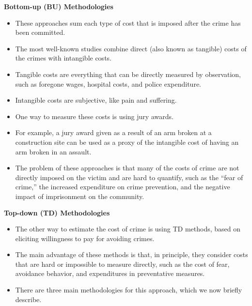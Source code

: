 \documentclass[static]{JJH-Beamer}
\begin{document}
\begin{frame}

\begin{center}
\textbf{Bottom-up (BU) Methodologies}
\end{center}
\begin{itemize}
\item These approaches sum each type of cost that is imposed after the crime has been committed.
\item The most well-known studies combine direct (also known as tangible) costs of the crimes with intangible costs.
\item Tangible costs are everything that can be directly measured by observation, such as foregone wages, hospital costs, and police expenditure.
\item Intangible costs are subjective, like pain and suffering.
\item One way to measure these costs is using jury awards.
\item For example, a jury award given as a result of an arm broken at a construction site can be used as a proxy of the intangible cost of having an arm broken in an assault.
\item The problem of these approaches is that many of the costs of crime are not directly imposed on the victim and are hard to quantify, such as the ``fear of crime,'' the increased expenditure on crime prevention, and the negative impact of imprisonment on the community.
\end{itemize}

\end{frame}

\begin{frame}

\begin{center}
\textbf{Top-down (TD) Methodologies}
\end{center}
\begin{itemize}
\item The other way to estimate the cost of crime is using TD methods, based on eliciting willingness to pay for avoiding crimes.
\item The main advantage of these methods is that, in principle, they consider costs that are hard or impossible to measure directly, such as the cost of fear, avoidance behavior, and expenditures in preventative measures.
\item There are three main methodologies for this approach, which we now briefly describe.
\end{itemize}

\end{frame}
\end{document}
